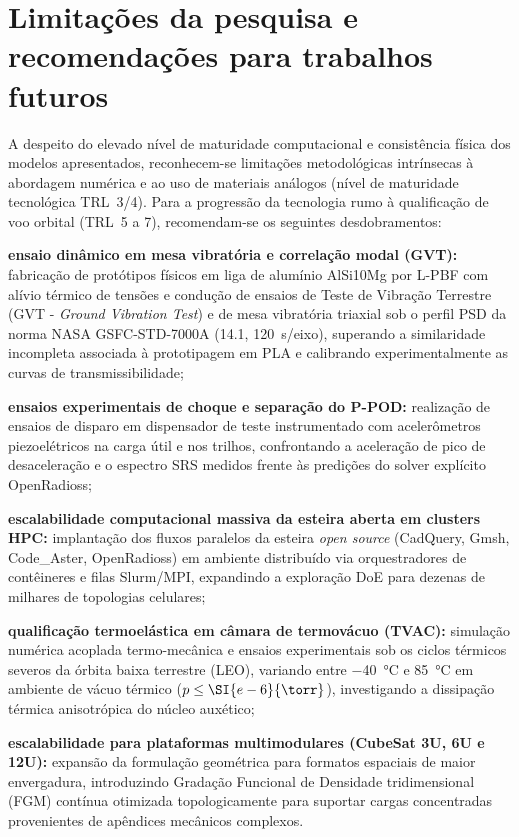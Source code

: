 \section{Limitações da pesquisa e recomendações para trabalhos futuros}
\label{sec:limitacoes}

A despeito do elevado nível de maturidade computacional e consistência física dos modelos apresentados, reconhecem-se limitações metodológicas intrínsecas à abordagem numérica e ao uso de materiais análogos (nível de maturidade tecnológica TRL~3/4). Para a progressão da tecnologia rumo à qualificação de voo orbital (TRL~5 a 7), recomendam-se os seguintes desdobramentos:

\begin{alineas}
  \item \textbf{ensaio dinâmico em mesa vibratória e correlação modal (GVT):} fabricação de protótipos físicos em liga de alumínio AlSi10Mg por L-PBF com alívio térmico de tensões e condução de ensaios de Teste de Vibração Terrestre (GVT - \textit{Ground Vibration Test}) e de mesa vibratória triaxial sob o perfil PSD da norma NASA GSFC-STD-7000A (\SI{14.1}{\Grms}, \SI{120}{\second}/eixo), superando a similaridade incompleta associada à prototipagem em PLA e calibrando experimentalmente as curvas de transmissibilidade;
  
  \item \textbf{ensaios experimentais de choque e separação do P-POD:} realização de ensaios de disparo em dispensador de teste instrumentado com acelerômetros piezoelétricos na carga útil e nos trilhos, confrontando a aceleração de pico de desaceleração e o espectro SRS medidos frente às predições do solver explícito OpenRadioss;
  
  \item \textbf{escalabilidade computacional massiva da esteira aberta em clusters HPC:} implantação dos fluxos paralelos da esteira \textit{open source} (CadQuery, Gmsh, Code\_Aster, OpenRadioss) em ambiente distribuído via orquestradores de contêineres e filas Slurm/MPI, expandindo a exploração DoE para dezenas de milhares de topologias celulares;
  
  \item \textbf{qualificação termoelástica em câmara de termovácuo (TVAC):} simulação numérica acoplada termo-mecânica e ensaios experimentais sob os ciclos térmicos severos da órbita baixa terrestre (LEO), variando entre \SI{-40}{\celsius} e \SI{+85}{\celsius} em ambiente de vácuo térmico ($p \le \SI{e-6}{\torr}$), investigando a dissipação térmica anisotrópica do núcleo auxético;
  
  \item \textbf{escalabilidade para plataformas multimodulares (CubeSat 3U, 6U e 12U):} expansão da formulação geométrica para formatos espaciais de maior envergadura, introduzindo Gradação Funcional de Densidade tridimensional (FGM) contínua otimizada topologicamente para suportar cargas concentradas provenientes de apêndices mecânicos complexos.
\end{alineas}
